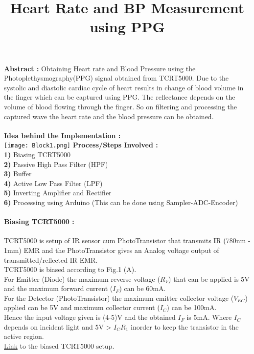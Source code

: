 \documentclass{homework}
\title{\Large{Heart Rate and BP Measurement using PPG}}
\begin{document}
 \maketitle

\textbf{Abstract :}  Obtaining Heart rate and Blood Pressure using the Photoplethysmography(PPG) signal obtained from TCRT5000. Due to the systolic and diastolic cardiac cycle of heart results in change of blood volume in the finger which can be captured using PPG. The reflectance depends on the volume of blood flowing through the finger. So on filtering and processing the captured wave the heart rate and the blood pressure can be obtained.\\
 \\
 \textbf{Idea behind the Implementation :}\\
 \texttt{[image: Block1.png]}
\textbf{Process/Steps Involved :}\\
\indent \textbf{1)} Biasing TCRT5000\\
\indent \textbf{2)} Passive High Pass Filter (HPF)\\
\indent \textbf{3)} Buffer\\
\indent \textbf{4)} Active Low Pass Filter (LPF)\\
\indent \textbf{5)} Inverting Amplifier and Rectifier\\
\indent \textbf{6)} Processing using Arduino (This can be done using Sampler-ADC-Encoder)\\
 \\
 \textbf{Biasing TCRT5000 :}\\
  \\
 TCRT5000 is setup of IR sensor cum PhotoTransistor that transmits IR (780nm - 1mm) EMR and the PhotoTransistor gives an Analog voltage output of transmitted/reflected IR EMR.\\
 TCRT5000 is biased according to Fig.1 (A). \\
 For Emitter (Diode) the maximum reverse voltage ($R_V$) that can be applied is 5V and the maximum forward current ($I_F$) can be 60mA.\\
 For the Detector (PhotoTransistor) the maximum emitter collector voltage ($V_{EC}$) applied can be 5V and maximum collector current ($I_C$) can be 100mA.\\
 Hence the input voltage given is (4-5)V and the obtained $I_F$ is 5mA. Where $I_C $ depends on incident light and 5V > $I_CR_1$ inorder to keep the transistor in the active region.\\
 \href{https://drive.google.com/file/d/1Nk3fOqGYrcH04Q41L5S5DGP_ae-Hyu3v/view?usp=sharing}{Link} to the biased TCRT5000 setup.\\
\end{document}
